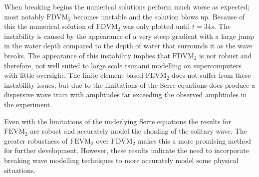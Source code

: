 When breaking begins the numerical solutions perform much worse as expected; most notably $\text{FDVM}_2$ becomes unstable and the solution blows up. Because of this the numerical solution of $\text{FDVM}_2$ was only plotted until $t = 34s$. The instability is caused by the appearance of a very steep gradient with a large jump in the water depth compared to the depth of water that surrounds it as the wave breaks. The appearance of this instability implies that $\text{FDVM}_2$ is not robust and therefore, not well suited to large scale tsunami modelling on supercomputers with little oversight. The finite element based $\text{FEVM}_2$ does not suffer from these instability issues, but due to the limitations of the Serre equations does produce a dispersive wave train with amplitudes far exceeding the observed amplitudes in the experiment. 

Even with the limitations of the underlying Serre equations the results for $\text{FEVM}_2$ are robust and accurately model the shoaling of the solitary wave. The greater robustness of $\text{FEVM}_2$ over $\text{FDVM}_2$ makes this a more promising method for further development. However, these results indicate the need to incorporate breaking wave modelling techniques to more accurately model some physical situations. 

